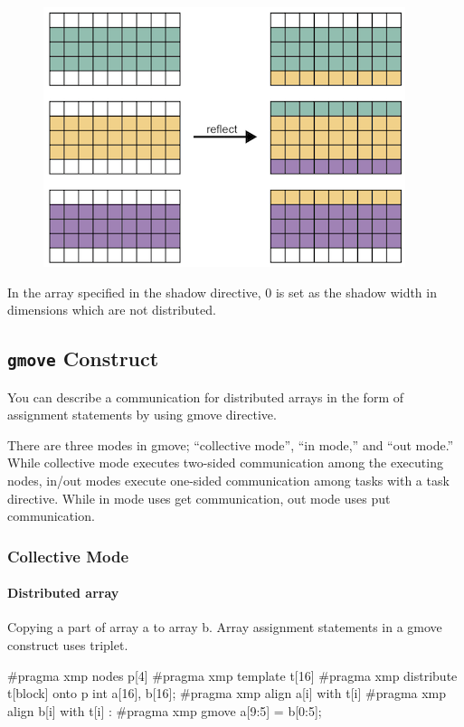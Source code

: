 \begin{figure}
  \centering
  \includegraphics{figs/1of2.png}
\end{figure}

In the array specified in the shadow directive, 0 is set as the shadow
width in dimensions which are not distributed.


\subsection{{\tt gmove} Construct}

You can describe a communication for distributed arrays in the form of
assignment statements by using gmove directive.

There are three modes in gmove; “collective mode”, “in mode,” and “out
mode.” While collective mode executes two-sided communication among the
executing nodes, in/out modes execute one-sided communication among
tasks with a task directive. While in mode uses get communication, out
mode uses put communication.

\subsubsection{Collective Mode}

\paragraph{Distributed array}

Copying a part of array a to array b. Array assignment statements in a
gmove construct uses triplet.

\begin{XCexample}
#pragma xmp nodes p[4]
#pragma xmp template t[16]
#pragma xmp distribute t[block] onto p
int a[16], b[16];
#pragma xmp align a[i] with t[i]
#pragma xmp align b[i] with t[i]
     :
#pragma xmp gmove
  a[9:5] = b[0:5];
\end{XCexample}

